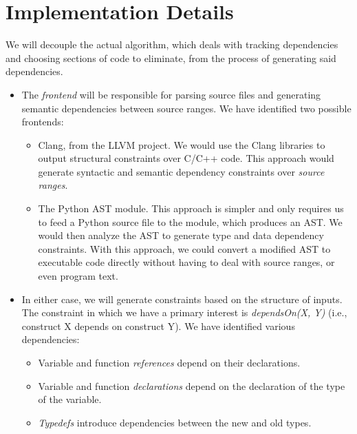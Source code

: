 \documentclass[11pt]{article}
\begin{document}
\section{Implementation Details}
We will decouple the actual algorithm, which deals with tracking dependencies
and choosing sections of code to eliminate, from the process of generating said dependencies.

\begin{itemize}
\item{The \emph{frontend} will be responsible for parsing source files and generating
semantic dependencies between source ranges.  We have identified two possible frontends:
}
\begin{itemize}
\item{Clang, from the LLVM project.  We would use the Clang libraries to output structural constraints over C/C++ code.  This
  approach would generate syntactic and semantic dependency constraints over \emph{source ranges}.}
\item{The Python AST module.  This approach is simpler and only requires us to feed a Python source
file to the module, which produces an AST.  We would then analyze the AST to generate type and data
dependency constraints.  With this approach, we could convert a modified
AST to executable code directly without having to deal with source ranges, or even program text.}
\end{itemize}

\item In either case, we will generate constraints based on the
structure of inputs. The constraint in which we have a primary interest is
\emph{dependsOn(X, Y)} (i.e., construct X depends on construct Y).  We have identified various
dependencies:

\begin{itemize}
\item{Variable and function \emph{references} depend on their declarations.}
\item{Variable and function \emph{declarations} depend on the declaration of the type of the variable.}
\item{\emph{Typedefs} introduce dependencies between the new and old types.}
\end{itemize}


\end{itemize}
\end{document}
